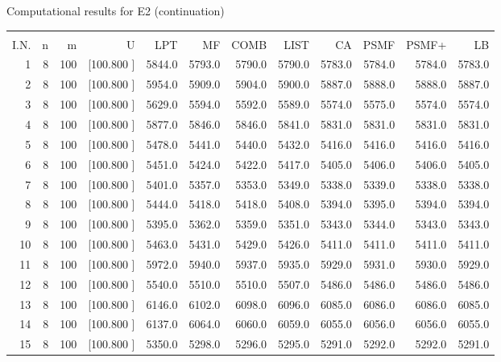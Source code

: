 \documentclass[12pt,a4paper]{article}
\begin{document}
\begin{center}
 Computational results for E2 (continuation) {\tiny
\begin{tabular}{r r r r r r r r r r r r}\hline
    &   &   &          &        &        &        &        &        &        &        &       \\[-0.1in]
  I.N.  &  n  &  m  &  U  &  LPT  &  MF  &  COMB  &  LIST  &  CA  & PSMF &PSMF+ & LB \\[0.03in]
\hline
   1&  8&100&[100.800   ]&  5844.0&  5793.0&  5790.0&  5790.0&  5783.0&  5784.0&  5784.0&  5783.0\\[-0.02in]
   2&  8&100&[100.800   ]&  5954.0&  5909.0&  5904.0&  5900.0&  5887.0&  5888.0&  5888.0&  5887.0\\[-0.02in]
   3&  8&100&[100.800   ]&  5629.0&  5594.0&  5592.0&  5589.0&  5574.0&  5575.0&  5574.0&  5574.0\\[-0.02in]
   4&  8&100&[100.800   ]&  5877.0&  5846.0&  5846.0&  5841.0&  5831.0&  5831.0&  5831.0&  5831.0\\[-0.02in]
   5&  8&100&[100.800   ]&  5478.0&  5441.0&  5440.0&  5432.0&  5416.0&  5416.0&  5416.0&  5416.0\\[-0.02in]
   6&  8&100&[100.800   ]&  5451.0&  5424.0&  5422.0&  5417.0&  5405.0&  5406.0&  5406.0&  5405.0\\[-0.02in]
   7&  8&100&[100.800   ]&  5401.0&  5357.0&  5353.0&  5349.0&  5338.0&  5339.0&  5338.0&  5338.0\\[-0.02in]
   8&  8&100&[100.800   ]&  5444.0&  5418.0&  5418.0&  5408.0&  5394.0&  5395.0&  5394.0&  5394.0\\[-0.02in]
   9&  8&100&[100.800   ]&  5395.0&  5362.0&  5359.0&  5351.0&  5343.0&  5344.0&  5343.0&  5343.0\\[-0.02in]
  10&  8&100&[100.800   ]&  5463.0&  5431.0&  5429.0&  5426.0&  5411.0&  5411.0&  5411.0&  5411.0\\[-0.02in]
  11&  8&100&[100.800   ]&  5972.0&  5940.0&  5937.0&  5935.0&  5929.0&  5931.0&  5930.0&  5929.0\\[-0.02in]
  12&  8&100&[100.800   ]&  5540.0&  5510.0&  5510.0&  5507.0&  5486.0&  5486.0&  5486.0&  5486.0\\[-0.02in]
  13&  8&100&[100.800   ]&  6146.0&  6102.0&  6098.0&  6096.0&  6085.0&  6086.0&  6086.0&  6085.0\\[-0.02in]
  14&  8&100&[100.800   ]&  6137.0&  6064.0&  6060.0&  6059.0&  6055.0&  6056.0&  6056.0&  6055.0\\[-0.02in]
  15&  8&100&[100.800   ]&  5350.0&  5298.0&  5296.0&  5295.0&  5291.0&  5292.0&  5292.0&  5291.0\\[-0.02in]

\end{tabular}}
\end{center}
\end{document}
